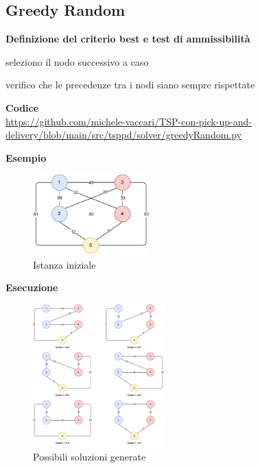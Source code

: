 \documentclass[9pt]{beamer}
\begin{document}
\subsection{Greedy Random}
\begin{frame}[allowframebreaks]{\subsecname}
	\textbf{Definizione del criterio best e test di ammissibilità}
	\begin{description}[style=unboxed,leftmargin=0cm]
		\item[criterio best] seleziono il nodo successivo a caso
		\item[test di ammissibilità] verifico che le precedenze tra i nodi siano sempre rispettate
	\end{description}

	\textbf{Codice} \\
		\href{https://github.com/michele-vaccari/TSP-con-pick-up-and-delivery/blob/main/src/tsppd/solver/greedyRandom.py}{https://github.com/michele-vaccari/TSP-con-pick-up-and-delivery/blob/main/src/tsppd/solver/greedyRandom.py}

\framebreak

	\textbf{Esempio}
	\begin{figure}[h]
	\centering
	\includegraphics[width=0.4\textwidth]
	{../images/graph-tsppd-with-two-customers}	
	\caption{Istanza iniziale}
	\end{figure}

\framebreak

	\textbf{Esecuzione}
      	\begin{figure}[h]
	\centering
	\includegraphics[width=0.45\textwidth]
	{../images/graph-all-solutions-with-cost-tsppd-with-two-customers}	
	\caption{Possibili soluzioni generate}
	\end{figure}


\end{frame}
\end{document}
